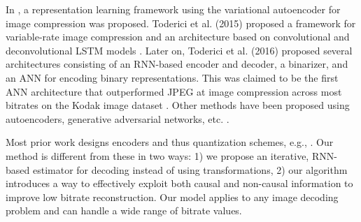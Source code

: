\documentclass[smallabstract,smallcaptions]{dccpaper}
\begin{document}
In \cite{gregor2016conceptualcompression}, a representation learning framework using the variational autoencoder for image compression was proposed. Toderici et al. (2015) proposed a framework for variable-rate image compression and an architecture based on convolutional and deconvolutional LSTM models \cite{toderici2015}. Later on, Toderici et al. (2016) proposed several architectures consisting of an RNN-based encoder and decoder, a binarizer, and an ANN for encoding binary representations. This was claimed to be the first ANN architecture that outperformed JPEG at image compression across most bitrates on the Kodak image dataset \cite{toderici2016full}. Other methods have been proposed using autoencoders, generative adversarial networks, etc. \cite{Theis2017,rippel2017real}. %

Most prior work designs encoders and thus quantization schemes, e.g., \cite{toderici2015}. Our method is different from these in two ways: 1) we propose an iterative, RNN-based estimator for decoding instead of using transformations, 2) our algorithm introduces a way to effectively exploit both causal and non-causal 
information to improve low bitrate reconstruction. Our model applies to any image decoding problem and can handle a wide range of bitrate values.
\end{document}
